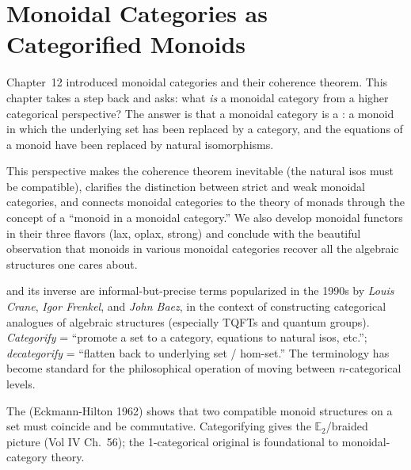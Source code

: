 
\chapter{Monoidal Categories as Categorified Monoids}

\begin{overviewbox}
Chapter~12 introduced monoidal categories and their coherence theorem. This
chapter takes a step back and asks: what \emph{is} a monoidal category from a
higher categorical perspective? The answer is that a monoidal category is a
: a monoid in which the underlying set has been
replaced by a category, and the equations of a monoid have been replaced by
natural isomorphisms.

This perspective makes the coherence theorem inevitable (the natural isos must
be compatible), clarifies the distinction between strict and weak monoidal
categories, and connects monoidal categories to the theory of monads through
the concept of a ``monoid in a monoidal category.'' We also develop monoidal
functors in their three flavors (lax, oplax, strong) and conclude with the
beautiful observation that monoids in various monoidal categories recover all
the algebraic structures one cares about.
\end{overviewbox}


\begin{nameorigin}
 and its inverse  are
informal-but-precise terms popularized in the 1990s by \emph{Louis
Crane}, \emph{Igor Frenkel}, and \emph{John Baez}, in the context of
constructing categorical analogues of algebraic structures (especially
TQFTs and quantum groups). \emph{Categorify} = ``promote a set to a
category, equations to natural isos, etc.''; \emph{decategorify} =
``flatten back to underlying set / hom-set.'' The terminology has
become standard for the philosophical operation of moving between
$n$-categorical levels.

The  (Eckmann-Hilton 1962) shows that two
compatible monoid structures on a set must coincide and be commutative.
Categorifying gives the $\mathbb{E}_2$/braided picture (Vol IV Ch.~56);
the 1-categorical original is foundational to monoidal-category theory.
\end{nameorigin}

